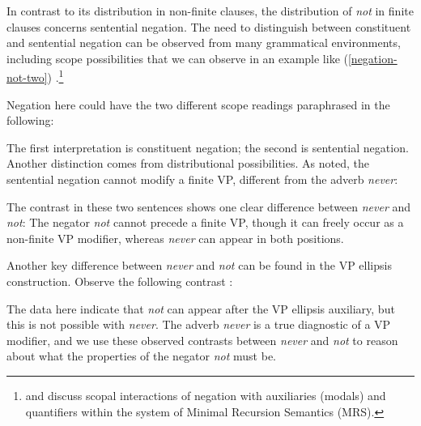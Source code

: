 \documentclass[output=paper
	        ,collection
	        ,collectionchapter
 	        ,biblatex
                ,babelshorthands
                ,newtxmath
                ,draftmode
                ,colorlinks, citecolor=brown
]{langscibook}
\begin{document}
{\begin{exe}
\begin{xlist}
\begin{exe}
\begin{xlist}
\eal
{}
\zl

In contrast to its distribution
in non-finite clauses, the distribution
of \textit{not}
 in finite clauses concerns sentential
 negation.
  The need to distinguish between constituent and sentential negation can be
  observed from
  many grammatical environments, including scope
possibilities that we can observe in an example like (\ref{negation-not-two}) \parencites(see){Klima:64}{Baker:91}{Warner2000a-u}[]{kimmichaelis:2020}.\footnote{\citet{Warner2000a-u} and \citet{BL:13}
discuss scopal interactions of negation with auxiliaries (modals) and quantifiers
within the system of Minimal Recursion Semantics (MRS).}

\z
%
Negation here could have the two different scope readings
paraphrased in the following:


\eal
{}
\zl
%
The first interpretation is constituent negation; the second is
sentential negation. Another distinction comes from
distributional possibilities. As noted, the sentential
negation  cannot modify a finite
VP, different from the adverb \textit{never}:

\eal
{}
\zl
%
The contrast in these two sentences
shows one clear difference between \textit{never}
and \textit{not}:  The negator \textit{not} cannot
precede a finite VP, though it can freely occur
as a non-finite VP modifier, whereas \textit{never} can appear in both positions.

%
%
%
%

Another key difference between \textit{never} and \textit{not} can be found in
the VP ellipsis construction.  Observe the following
contrast \citep{KS:02}:

\eal
\label{negation-vpe-not-ex}
\zl
%
\noindent The data here indicate that \textit{not} can appear
after the VP ellipsis auxiliary, but this is not possible with
\emph{never}.
The adverb \textit{never} is a true
diagnostic of a VP modifier, and we use
these observed contrasts
between \textit{never} and \textit{not} to reason about what the properties of the negator \textit{not} must be.
%
%


\end{xlist}
\end{exe}
\end{xlist}
\end{exe}}
\end{document}
